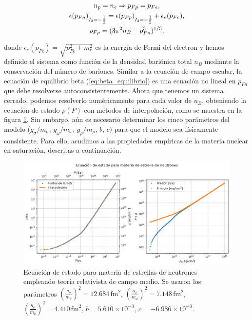 \begin{gather}
	n_p = n_e \Rightarrow p_{Fp} = p_{Fe}, \\
	\epsilon(p_{Fn})_{I_3=-\tfrac{1}{2}} = \epsilon(p_{Fp})_{I_3=+\tfrac{1}{2}} + \epsilon_e(p_{Fe}), \label{eq:beta_equilibrio} \\
	p_{Fp} = (3\pi^2n_B - p_{Fn}^3)^{1/3},
\end{gather}

donde $\epsilon_e(p_{Fe}) = \sqrt{p_{Fe}^2 + m_e^2}$ es la energía de Fermi del electron y hemos definido el sistema como función de la densidad bariónica total $n_B$ mediante la conservación del número de bariones. Similar a la ecuación de campo escalar, la ecuación de equilibrio beta (\ref{eq:beta_equilibrio}) es una ecuación no lineal en $p_{Fn}$ que debe resolverse autoconsistentemente. Ahora que tenemos un sistema cerrado, podemos resolverlo numéricamente para cada valor de $n_B$, obteniendo la ecuación de estado $\rho(P)$ con métodos de interpolación, como se muestra en la figura \ref{fig:materiaestelarbase}. Sin embargo, aún es necesario determinar los cinco parámetros del modelo ($g_\sigma/m_\sigma$, $g_\omega/m_\omega$, $g_\rho/m_\rho$, $b$, $c$) para que el modelo sea físicamente consistente. Para ello, acudimos a las propiedades empíricas de la materia nuclear en saturación, descritas a continuación.

\begin{figure}[h]
	\centering
	\includegraphics[width=0.95\linewidth]{Figuras/materia_estelar_base}
	\caption[Ecuación de estado para la materia de estrellas de neutrones.]{Ecuación de estado para materia de estrellas de neutrones empleando teoría relativista de campo medio. Se usaron los parámetros $\left(\frac{g_\sigma}{m_\sigma}\right)^2=12.684\,\text{fm}^2$, $\left(\frac{g_\omega}{m_\omega}\right)^2=7.148\,\text{fm}^2$, $\left(\frac{g_\rho}{m_\rho}\right)^2=4.410\,\text{fm}^2$, $b=5.610\times10^{-3}$, $c=-6.986\times10^{-3}$.}
	\label{fig:materiaestelarbase}
\end{figure}


